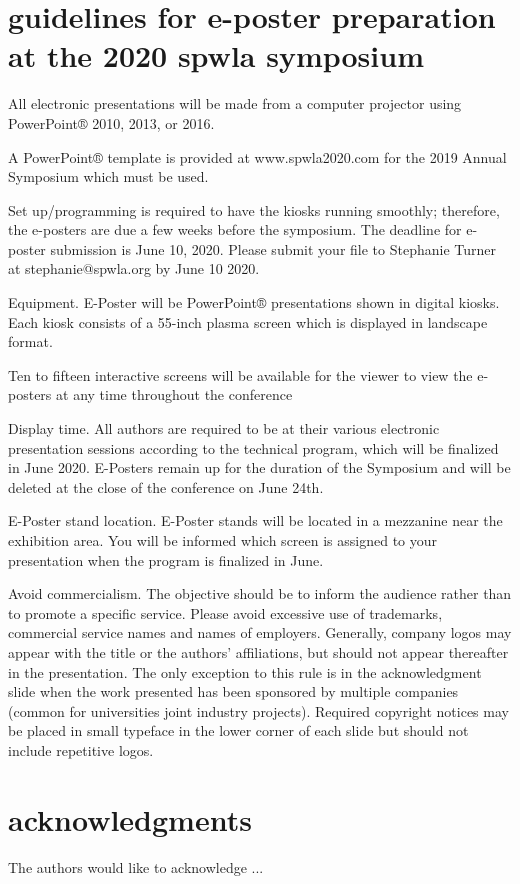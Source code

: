 \documentclass[10pt,twocolumn,twoside]{article}
\begin{document}
\section{guidelines for e-poster preparation at the 2020 spwla symposium}
All electronic presentations will be made from a computer projector using PowerPoint® 2010, 2013, or 2016. 

A PowerPoint® template is provided at www.spwla2020.com for the 2019 Annual Symposium which must be used.

Set up/programming is required to have the kiosks running smoothly; therefore, the e-posters are due a few weeks before the symposium. The deadline for e-poster submission is June 10, 2020. Please submit your file to Stephanie Turner at stephanie@spwla.org by June 10 2020. 

Equipment.  E-Poster will be PowerPoint® presentations shown in digital kiosks. Each kiosk consists of a 55-inch plasma screen which is displayed in landscape format. 

Ten to fifteen interactive screens will be available for the viewer to view the e-posters at any time throughout the conference

Display time. All authors are required to be at their various electronic presentation sessions according to the technical program, which will be finalized in June 2020. E-Posters remain up for the duration of the Symposium and will be deleted at the close of the conference on June 24th. 

E-Poster stand location.  E-Poster stands will be located in a mezzanine near the exhibition area. You will be informed which screen is assigned to your presentation when the program is finalized in June.

Avoid commercialism.  The objective should be to inform the audience rather than to promote a specific service. Please avoid excessive use of trademarks, commercial service names and names of employers. Generally, company logos may appear with the title or the authors’ affiliations, but should not appear thereafter in the presentation. The only exception to this rule is in the acknowledgment slide when the work presented has been sponsored by multiple companies (common for universities joint industry projects). Required copyright notices may be placed in small typeface in the lower corner of each slide but should not include repetitive logos.

\section{acknowledgments}
The authors would like to acknowledge ...
\end{document}
